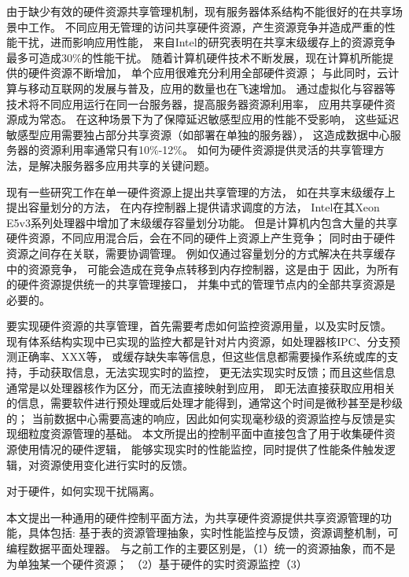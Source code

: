 \iffalse

由于缺少有效的硬件资源共享管理机制，现有服务器体系结构不能很好的在共享场景中工作。
不同应用无管理的访问共享硬件资源，产生资源竞争并造成严重的性能干扰，进而影响应用性能，
来自Intel的研究\cite{intel}表明在共享末级缓存上的资源竞争最多可造成30\%的性能干扰。
随着计算机硬件技术不断发展，现在计算机所能提供的硬件资源不断增加，
单个应用很难充分利用全部硬件资源；
与此同时，云计算与移动互联网的发展与普及，应用的数量也在飞速增加。
通过虚拟化与容器等技术将不同应用运行在同一台服务器，提高服务器资源利用率，
应用共享硬件资源成为常态。
在这种场景下为了保障延迟敏感型应用的性能不受影响，
这些延迟敏感型应用需要独占部分共享资源（如部署在单独的服务器\cite{}），
这造成数据中心服务器的资源利用率通常只有10\%-12\%。
如何为硬件资源提供灵活的共享管理方法，是解决服务器多应用共享的关键问题。


现有一些研究工作在单一硬件资源上提出共享管理的方法，
如在共享末级缓存上提出容量划分的方法\cite{}，
在内存控制器上提供请求调度的方法\cite{}，
Intel在其Xeon E5v3系列处理器中增加了末级缓存容量划分功能。
但是计算机内包含大量的共享硬件资源，不同应用混合后，会在不同的硬件上资源上产生竞争；
同时由于硬件资源之间存在关联，需要协调管理。
例如仅通过容量划分的方式解决在共享缓存中的资源竞争，
可能会造成在竞争点转移到内存控制器，这是由于
因此，为所有的硬件资源提供统一的共享管理接口，
并集中式的管理节点内的全部共享资源是必要的。

%
要实现硬件资源的共享管理，首先需要考虑如何监控资源用量，以及实时反馈。 %
现有体系结构实现中已实现的监控大都是针对片内资源，如处理器核IPC、分支预测正确率、XXX等，
或缓存缺失率等信息，但这些信息都需要操作系统或库的支持，手动获取信息，无法实现实时的监控，
更无法实现实时反馈；而且这些信息通常是以处理器核作为区分，而无法直接映射到应用，
即无法直接获取应用相关的信息，需要软件进行预处理或后处理才能得到，通常这个时间是微秒甚至是秒级的；
当前数据中心需要高速的响应，因此如何实现毫秒级的资源监控与反馈是实现细粒度资源管理的基础。
本文所提出的控制平面中直接包含了用于收集硬件资源使用情况的硬件逻辑，
能够实现实时的性能监控，同时提供了性能条件触发逻辑，对资源使用变化进行实时的反馈。

对于硬件，如何实现干扰隔离。 %

本文提出一种通用的硬件控制平面方法，为共享硬件资源提供共享资源管理的功能，具体包括:
基于表的资源管理抽象，实时性能监控与反馈，资源调整机制，可编程数据平面处理器。
与之前工作的主要区别是，（1）统一的资源抽象，而不是为单独某一个硬件资源；
（2）基于硬件的实时资源监控（3）

